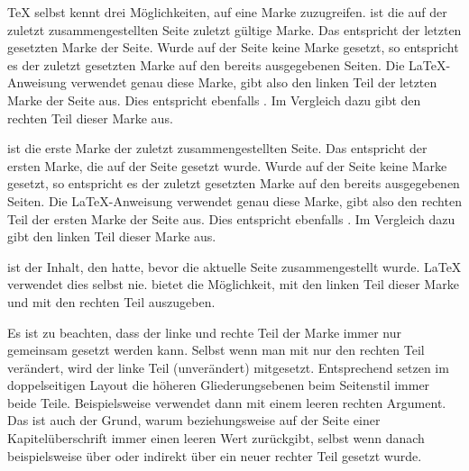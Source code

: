   \TeX{} selbst kennt drei Möglichkeiten, auf eine Marke zuzugreifen.
   ist die auf der
  zuletzt zusammengestellten Seite zuletzt gültige Marke. Das entspricht der
  letzten gesetzten Marke der Seite. Wurde auf der Seite keine Marke gesetzt,
  so entspricht es der zuletzt gesetzten Marke auf den bereits ausgegebenen
  Seiten. Die \LaTeX-Anweisung 
  verwendet genau diese Marke, gibt also den linken Teil der letzten Marke der
  Seite aus. Dies entspricht ebenfalls
  . Im Vergleich dazu gibt
   den rechten Teil dieser
  Marke aus.

   ist die
  erste Marke der zuletzt zusammengestellten Seite. Das entspricht der ersten
  Marke, die auf der Seite gesetzt wurde. Wurde auf der Seite keine Marke
  gesetzt, so entspricht es der zuletzt gesetzten Marke auf den bereits
  ausgegebenen Seiten. Die \LaTeX-Anweisung
   verwendet genau diese Marke,
  gibt also den rechten Teil der ersten Marke der Seite aus. Dies entspricht
  ebenfalls . Im
  Vergleich dazu gibt 
  den linken Teil dieser Marke aus.

   ist der Inhalt,
  den  hatte, bevor die aktuelle Seite zusammengestellt
  wurde. \LaTeX{} verwendet dies selbst nie.
   bietet die Möglichkeit, mit
   den linken Teil
  dieser Marke und mit 
  den rechten Teil auszugeben.

  Es ist zu beachten, dass der linke und rechte Teil der
  Marke immer nur gemeinsam gesetzt werden kann. Selbst wenn man mit
   nur den rechten Teil
  verändert, wird der linke Teil (unverändert) mitgesetzt. Entsprechend
  setzen im doppelseitigen Layout die höheren Gliederungsebenen beim
  Seitenstil
  immer beide Teile. Beispielsweise verwendet
   dann
   mit einem leeren rechten Argument. Das ist
  auch der Grund, warum  beziehungsweise
   auf der Seite einer Kapitelüberschrift immer einen
  leeren Wert zurückgibt, selbst wenn danach beispielsweise über
   oder indirekt über
   ein neuer rechter Teil
   gesetzt
  wurde.

